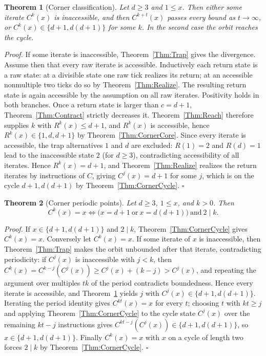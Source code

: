 \documentclass[11pt,letterpaper]{article}
\newtheorem{theorem}{Theorem}
\newenvironment{proof}{\noindent\textit{Proof.}}{\hfill\(\square\)}
\begin{document}
\begin{theorem}[Corner classification]\label{Thm:CornerClass}
Let \(d\ge3\) and \(1\le x\). Then either some iterate \(C^{k}(x)\) is
inaccessible, and then \(C^{k+t}(x)\) passes every bound as
\(t\to\infty\), or \(C^{k}(x)\in\{d+1,d(d+1)\}\) for some \(k\). In the
second case the orbit reaches the cycle.
\end{theorem}

\begin{proof}
If some iterate is inaccessible, Theorem~\ref{Thm:Trap} gives the divergence.
Assume then that every raw iterate is accessible. Inductively each return
state is a raw state: at a divisible state one raw tick realizes its return;
at an accessible nonmultiple two ticks do so by
Theorem~\ref{Thm:Realize}. The resulting return state is again accessible
by the assumption on all raw iterates. Positivity holds in both branches.
Once a return state is larger than \(c=d+1\),
Theorem~\ref{Thm:Contract} strictly decreases it.
Theorem~\ref{Thm:Reach} therefore supplies \(k\) with
\(R^{k}(x)\le d+1\), and \(R^{k}(x)\) is accessible, hence
\(R^{k}(x)\in\{1,d,d+1\}\) by Theorem~\ref{Thm:CornerCore}. Since every
iterate is accessible, the trap alternatives \(1\) and \(d\) are excluded:
\(R(1)=2\) and \(R(d)=1\) lead to the inaccessible state \(2\) (for \(d\ge3\)),
contradicting accessibility of all iterates. Hence \(R^{k}(x)=d+1\), and
Theorem~\ref{Thm:Realize} realizes the return iterates by instructions of
\(C\), giving \(C^{j}(x)=d+1\) for some \(j\), which is on the cycle
\(d+1,d(d+1)\) by Theorem~\ref{Thm:CornerCycle}.
\end{proof}

\begin{theorem}[Corner periodic points]\label{Thm:CornerPeriodic}
Let \(d\ge3\), \(1\le x\), and \(k>0\). Then
\[
 C^{k}(x)=x \iff \bigl(x=d+1\ \text{or}\ x=d(d+1)\bigr)\ \text{and}\ 2\mid k .
\]
\end{theorem}

\begin{proof}
If \(x\in\{d+1,d(d+1)\}\) and \(2\mid k\), Theorem~\ref{Thm:CornerCycle}
gives \(C^{k}(x)=x\). Conversely let \(C^{k}(x)=x\). If some iterate of \(x\)
is inaccessible, then Theorem~\ref{Thm:Trap} makes the orbit unbounded after
that iterate, contradicting periodicity: if \(C^{j}(x)\) is inaccessible with
\(j<k\), then \(C^{k}(x)=C^{k-j}(C^{j}(x))\ge C^{j}(x)+(k-j)>C^{j}(x)\), and
repeating the argument over multiples \(tk\) of the period contradicts
boundedness. Hence every iterate is accessible, and
Theorem~\ref{Thm:CornerClass} yields \(j\) with \(C^{j}(x)\in\{d+1,d(d+1)\}\).
Iterating the period identity gives \(C^{k t}(x)=x\) for every \(t\); choosing
\(t\) with \(kt\ge j\) and applying Theorem~\ref{Thm:CornerCycle} to the
cycle state \(C^{j}(x)\) over the remaining \(kt-j\) instructions gives
\(C^{kt-j}(C^{j}(x))\in\{d+1,d(d+1)\}\), so \(x\in\{d+1,d(d+1)\}\). Finally
\(C^{k}(x)=x\) with \(x\) on a cycle of length two forces \(2\mid k\) by
Theorem~\ref{Thm:CornerCycle}.
\end{proof}
\end{document}
